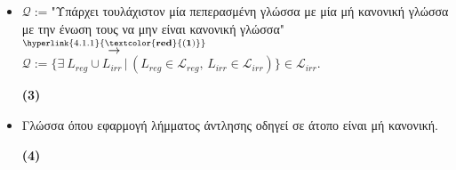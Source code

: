 \begin{tcolorbox}[colback=yellow!15!white, colframe=blue!50!white,
	fonttitle=\bfseries\Large, title = Απόδειξη - μέρος 1/3]
\begin{itemize}
		\begin{comment}
		\item Οι κανονικές γλώσσες είναι κλειστές ως προς την πράξη της διαφοράς όπως αποδεικνύουμε στην απάντηση
		του υποερωτήματος 4-β και συγκεκριμένα στην 2η απόδειξη.
		\begin{flushright}(5)\end{flushright}
		\end{comment}

		\item $\mathcal{Q} := $"Υπάρχει τουλάχιστον μία πεπερασμένη γλώσσα με μία μή
		κανονική γλώσσα με την ένωση τους να μην είναι κανονική
		γλώσσα"$\overset{\hyperlink{4.1.1}{\bf{\textcolor{red}{(1)}}}}{\rightarrow}$\\
		$\mathcal{Q} :=
		\{\exists\ L_{reg} \cup L_{irr} \,\vert\,
		(L_{reg} \in \mathcal{L}_{reg},\, L_{irr} \in \mathcal{L}_{irr})\}\in \mathcal{L}_{irr}$.
		\reducevspace\reducevspace\reducevspace\reducevspace\reducevspace\reducevspace\reducevspace
		\reducevspace\reducevspace\reducevspace\reducevspace\reducevspace\reducevspace\reducevspace
		\reducevspace\reducevspace\reducevspace\reducevspace\reducevspace\reducevspace\reducevspace
		\begin{flushright}\hypertarget{4.1.3}{\bf{(3)}}\end{flushright}

		\item Γλώσσα όπου εφαρμογή λήμματος άντλησης οδηγεί σε άτοπο είναι μή κανονική.
		\reducevspace\reducevspace\reducevspace\reducevspace\reducevspace\reducevspace\reducevspace
		\reducevspace\reducevspace\reducevspace\reducevspace\reducevspace\reducevspace\reducevspace
		\reducevspace\reducevspace\reducevspace\reducevspace\reducevspace\reducevspace\reducevspace
		\reducevspace\reducevspace\reducevspace\reducevspace\reducevspace\reducevspace\reducevspace
		\reducevspace\reducevspace\reducevspace\reducevspace\reducevspace\reducevspace\reducevspace
		\begin{flushright}\hypertarget{4.1.4}{\bf{(4)}}\end{flushright}



\end{itemize}
\end{tcolorbox}
